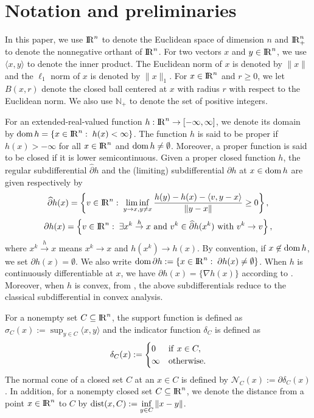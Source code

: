 \documentclass[10pt]{article}
\numberwithin{equation}{section}
\def\R{{\rm I\!R}}
\def\d{{\rm dist}}
\def\dom{{\rm dom}\,}
\begin{document}
\section{Notation and preliminaries}\label{sec2}
In this paper, we use $\R^n$ to denote the Euclidean space of dimension $n$ and $\R^n_+$ to denote the nonnegative orthant of $\R^n$. For two vectors $x$ and $y\in\R^n$, we use $\langle x, y\rangle$ to denote the inner product. The Euclidean norm of $x$ is denoted by $\|x\|$ and the $\ell_1$ norm of $x$ is denoted by $\|x\|_1$. For $x\in\R^n$ and $r\ge 0$, we let $B(x,r)$ denote the closed ball centered at $x$ with radius $r$ {\color{black} with respect to the Euclidean norm}. We also use $\mathbb{N}_+$ to denote the set of positive integers.

For an extended-real-valued function $h: \R^n \to [-\infty, \infty]$, we denote its domain by $\dom h = \{x\in\R^n:\; h(x) <\infty\}$. The function $h$ is said to be proper if $h(x)>-\infty$ for all $x \in \R^n$ and $\dom h\not = \emptyset$. Moreover, a proper function is said to be closed if it is lower semicontinuous. Given a proper closed function $h$, the regular subdifferential $\widehat{\partial} h$ and the (limiting) subdifferential $\partial h$ at $x\in\dom h$ are given respectively by
\[
\widehat{\partial} h(x) = \left\{v\in\R^n:\; \liminf_{y\to x, y\not= x}\frac{h(y) - h(x) - \langle v, y - x\rangle}{\|y - x\|}\geq 0 \right\},
\]
\[
\partial h(x) = \left\{v\in\R^n:\; \exists x^k\overset{h}\rightarrow x\text{ and } v^k\in\widehat{\partial} h(x^k) \text{ with } v^k\rightarrow v \right\},
\]
where $x^k\overset{h}\rightarrow x$ means $x^k\rightarrow x$ and $h(x^k)\rightarrow h(x)$. By convention, if $x\not\in\dom h$, we set $\partial h(x) = \emptyset$. We also write $\dom\partial h:= \{x\in\R^n:\; \partial h(x) \not= \emptyset\}$. When $h$ is continuously differentiable at $x$, we have $\partial h(x) = \{\nabla h(x)\}$ according to \cite[Exercise~8.8(b)]{RoWe98}. Moreover, when $h$ is convex, from \cite[Proposition~8.12]{RoWe98}, the above subdifferentials reduce to the classical subdifferential in convex analysis.

For a nonempty set $C\subseteq\R^n$, the support function is defined as $\sigma_C(x) := \sup_{y\in C}\langle x,y\rangle$ and the indicator function $\delta_C$ is defined as
\[
\delta_C(x): =\begin{cases}
  0 & {\rm if}\ x\in C,\\
  \infty & {\rm otherwise}.
\end{cases}
\]
The normal cone of a closed set $C$ at an $x\in C$ is defined by $\mathcal{N}_C(x):= \partial\delta_C(x)$. In addition, for a nonempty closed set $C\subseteq\R^n$, we denote the distance from a point $x\in\R^n$ to $C$ by $\d(x,C):=\inf\limits_{y\in C}\|x - y\|$.
\end{document}
